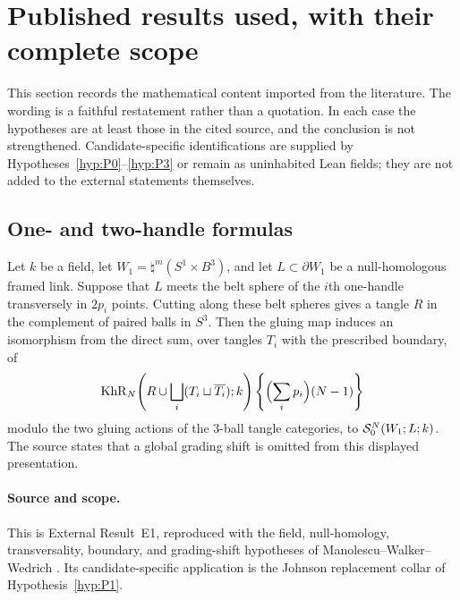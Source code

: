 \section{Published results used, with their complete scope}\label{sec:published-results}

This section records the mathematical content imported from the literature.
The wording is a faithful restatement rather than a quotation.  In each case
the hypotheses are at least those in the cited source, and the conclusion is
not strengthened.  Candidate-specific identifications are supplied by
Hypotheses~\ref{hyp:P0}--\ref{hyp:P3} or remain as uninhabited Lean fields;
they are not added to the external statements themselves.

\subsection{One- and two-handle formulas}

\begin{externalresult}\label{prop:mww-4.7}
Let $k$ be a field, let $W_1=\natural^m(S^1\times B^3)$, and let
$L\subset\partial W_1$ be a null-homologous framed link.  Suppose that $L$
meets the belt sphere of the $i$th one-handle transversely in $2p_i$ points.
Cutting along these belt spheres gives a tangle $R$ in the complement of
paired balls in $S^3$.  Then the gluing map induces an isomorphism from the
direct sum, over tangles $T_i$ with the prescribed boundary, of
\[
 \operatorname{KhR}_N\!\left(R\cup\bigsqcup_i(T_i\sqcup\overline{T_i});k\right)
 \left\{\Bigl(\sum_i p_i\Bigr)(N-1)\right\}
\]
modulo the two gluing actions of the $3$-ball tangle categories, to
$\mathcal{S}^{N}_{0}(W_1;L;k)$.  The source states that a global grading shift is omitted
from this displayed presentation.
\end{externalresult}

\paragraph{Source and scope.}
This is External Result~E1, reproduced with the field, null-homology,
transversality, boundary, and grading-shift hypotheses of
Manolescu--Walker--Wedrich \cite[Theorem~4.7]{ManolescuWalkerWedrich2023}.
Its candidate-specific application is the Johnson replacement collar of
Hypothesis~\ref{hyp:P1}.

